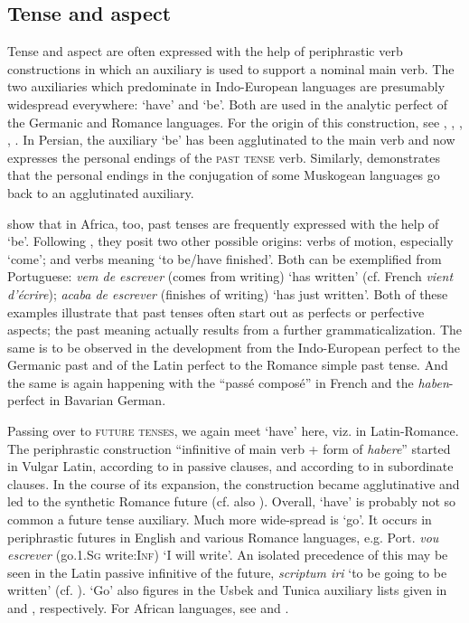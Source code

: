 \subsection{Tense and aspect} \label{sec:3.1.4}

Tense and aspect are often expressed with the help of periphrastic verb constructions in which an auxiliary is used to support a nominal main verb. The two auxiliaries which predominate in Indo-European languages are presumably widespread everywhere: ‘have’ and ‘be’. Both are used in the analytic perfect of the Germanic and Romance languages. For the origin of this construction, see \citet[141-143]{Meillet1912}, \citet[§\textsc{i}]{Benveniste1968}, \citet{Seiler1973}, \citet{Rosén1980}, \citet{Ramat1983}.\label{page31} In Persian, the auxiliary ‘be’ has been agglutinated to the main verb and now expresses the personal endings of the \textsc{past tense} verb. Similarly, \citet{Haas1977} demonstrates that the personal endings in the conjugation of some Muskogean languages go back to an agglutinated auxiliary.

\citet[130]{HeineEtAl1984} show that in Africa, too, past tenses are frequently expressed with the help of ‘be’. Following \citet[§5]{Givón1973}, they posit two other possible origins: verbs of motion, especially ‘come’; and verbs meaning ‘to be/have finished’. Both can be exemplified from Portuguese: \textit{vem de escrever} (comes from writing) ‘has written’ (cf. French \textit{vient d'écrire}); \textit{acaba de escrever} (finishes of writing) ‘has just written’. Both of these examples illustrate that past tenses often start out as perfects or perfective aspects; the past meaning actually results from a further grammaticalization. The same is to be observed in the development from the Indo-European perfect to the Germanic past and of the Latin perfect to the Romance simple past tense. And the same is again happening with the ``passé composé'' in French and the \textit{haben}-perfect in Bavarian German.

Passing over to \textsc{future tenses}, we again meet ‘have’ here, viz. in Latin-\linebreak Romance. The periphrastic construction ``infinitive of main verb + form of \textit{habere}'' started in Vulgar Latin, according to \citet[§\textsc{ii}]{Benveniste1968} in passive clauses, and according to \citet{Ineichen1980} in subordinate clauses. In the course of its expansion, the construction became agglutinative and led to the synthetic Romance future (cf. also \citealt[132--151]{Coseriu1974}). Overall, ‘have’ is probably not so common a future tense auxiliary. Much more wide-spread is ‘go’. It occurs in periphrastic futures in English and various Romance languages, e.g. Port. \textit{vou escrever} (go.1.\textsc{Sg} write:\textsc{Inf}) ‘I will write’. An isolated precedence of this may be seen in the Latin passive infinitive of the future, \textit{scriptum iri} ‘to be going to be written’ (cf. \citealt[109--114]{Ultan1978b}). ‘Go’ also figures in the Usbek and Tunica auxiliary lists given in \citet[85f]{Žirmunskij1966} and \citet[41--51]{Haas1941}, respectively. For African languages, see \citet[§5]{Givón1973} and \citet[131f]{HeineEtAl1984}.


